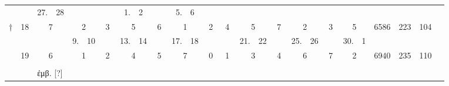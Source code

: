 \begin{tabular}{%
 r  r  r@{~}l r@{~}l r@{~}l r@{~}l r@{~}l r@{~}l
r@{~}l r@{~}l r@{~}l r@{~}l r@{~}l r@{~}l r@{~}l  r r r c
}
     &   &
  27.&28 &    &   &    &   &  1.&2  &    &   &  5.&6  &
  \\
† & 18 &
 \multicolumn{2}{c}{7} & \multicolumn{2}{c}{2} & \multicolumn{2}{c}{3} &
 \multicolumn{2}{c}{5} & \multicolumn{2}{c}{6} & \multicolumn{2}{c}{1} &
 \multicolumn{2}{c}{2} &
 \multicolumn{2}{c}{4} & \multicolumn{2}{c}{5} & \multicolumn{2}{c}{7} &
 \multicolumn{2}{c}{2} & \multicolumn{2}{c}{3} & \multicolumn{2}{c}{5} &
  6586  & 223 & 104 \\
%
\cmidrule{3-31}
  &    &
     &   &  9.&10 &    &   & 13.&14 &    &   & 17.&18 &
     &   &
     &   & 21.&22 &    &   & 25.&26 &    &   & 30.&1  &
  \\
  & 19 &
 \multicolumn{2}{c}{6} & \multicolumn{2}{c}{1} & \multicolumn{2}{c}{2} &
 \multicolumn{2}{c}{4} & \multicolumn{2}{c}{5} & \multicolumn{2}{c}{7} &
 \multicolumn{2}{c}{0} &
 \multicolumn{2}{c}{1} & \multicolumn{2}{c}{3} & \multicolumn{2}{c}{4} &
 \multicolumn{2}{c}{6} & \multicolumn{2}{c}{7} & \multicolumn{2}{c}{2} &
  6940  & 235 & 110 \\
%
\bottomrule
\\
& & \multicolumn{29}{l}{\footnotesize \super{†} \textgreek{ἐμβ. [?]}}\\
\end{tabular}
\caption{%
Characterismi Neomeniarum Enneadecaeteridis Metonicae
}

